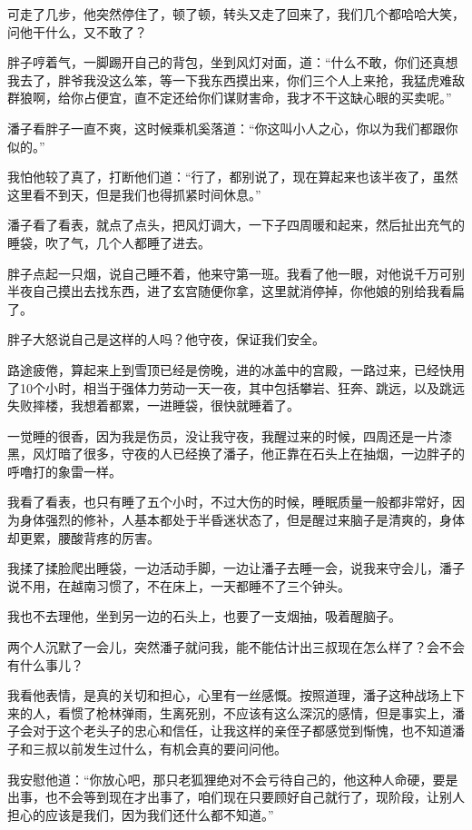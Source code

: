 可走了几步，他突然停住了，顿了顿，转头又走了回来了，我们几个都哈哈大笑，问他干什么，又不敢了？

胖子哼着气，一脚踢开自己的背包，坐到风灯对面，道：“什么不敢，你们还真想我去了，胖爷我没这么笨，等一下我东西摸出来，你们三个人上来抢，我猛虎难敌群狼啊，给你占便宜，直不定还给你们谋财害命，我才不干这缺心眼的买卖呢。”

潘子看胖子一直不爽，这时候乘机奚落道：“你这叫小人之心，你以为我们都跟你似的。”

我怕他较了真了，打断他们道：“行了，都别说了，现在算起来也该半夜了，虽然这里看不到天，但是我们也得抓紧时间休息。”

潘子看了看表，就点了点头，把风灯调大，一下子四周暖和起来，然后扯出充气的睡袋，吹了气，几个人都睡了进去。

胖子点起一只烟，说自己睡不着，他来守第一班。我看了他一眼，对他说千万可别半夜自己摸出去找东西，进了玄宫随便你拿，这里就消停掉，你他娘的别给我看扁了。

胖子大怒说自己是这样的人吗？他守夜，保证我们安全。

路途疲倦，算起来上到雪顶已经是傍晚，进的冰盖中的宫殿，一路过来，已经快用了10个小时，相当于强体力劳动一天一夜，其中包括攀岩、狂奔、跳远，以及跳远失败摔楼，我想着都累，一进睡袋，很快就睡着了。

一觉睡的很香，因为我是伤员，没让我守夜，我醒过来的时候，四周还是一片漆黑，风灯暗了很多，守夜的人已经换了潘子，他正靠在石头上在抽烟，一边胖子的呼噜打的象雷一样。

我看了看表，也只有睡了五个小时，不过大伤的时候，睡眠质量一般都非常好，因为身体强烈的修补，人基本都处于半昏迷状态了，但是醒过来脑子是清爽的，身体却更累，腰酸背疼的厉害。

我揉了揉脸爬出睡袋，一边活动手脚，一边让潘子去睡一会，说我来守会儿，潘子说不用，在越南习惯了，不在床上，一天都睡不了三个钟头。

我也不去理他，坐到另一边的石头上，也要了一支烟抽，吸着醒脑子。

两个人沉默了一会儿，突然潘子就问我，能不能估计出三叔现在怎么样了？会不会有什么事儿？

我看他表情，是真的关切和担心，心里有一丝感慨。按照道理，潘子这种战场上下来的人，看惯了枪林弹雨，生离死别，不应该有这么深沉的感情，但是事实上，潘子会对于这个老头子的忠心和信任，让我这样的亲侄子都感觉到惭愧，也不知道潘子和三叔以前发生过什么，有机会真的要问问他。

我安慰他道：“你放心吧，那只老狐狸绝对不会亏待自己的，他这种人命硬，要是出事，也不会等到现在才出事了，咱们现在只要顾好自己就行了，现阶段，让别人担心的应该是我们，因为我们还什么都不知道。”


